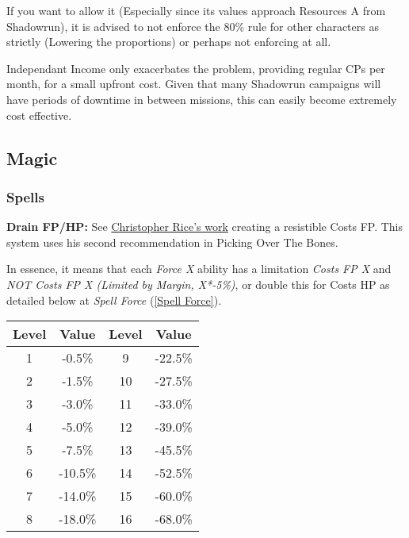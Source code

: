 \begin{multicols*}{2}
	If you want to allow it (Especially since its values approach Resources A from Shadowrun), it is advised to not enforce the 80\% rule for other characters as strictly (Lowering the proportions) or perhaps not enforcing at all.
	
	Independant Income only exacerbates the problem, providing regular CPs per month, for a small upfront cost. Given that many Shadowrun campaigns will have periods of downtime in between missions, this can easily become extremely cost effective.
	
	\subsection{Magic}
	
	\subsubsection{Spells}
	
	\textbf{Drain FP/HP:}
	See \textcolor{Blue}{\href{https://www.ravensnpennies.com/gurps101-fp-cost-limited-by-margin/}{Christopher Rice's work}} creating a resistible Costs FP. This system uses his second recommendation in Picking Over The Bones.
	
	In essence, it means that each \textit{Force X} ability has a limitation \textit{Costs FP X} and \textit{NOT Costs FP X (Limited by Margin, X*-5\%)}, or double this for Costs HP as detailed below at \textit{Spell Force} (\ref{Spell Force}).
	
	\begin{center}\label{drain_mods}
		\begin{tabular}{|c|c|c|c|}
			\hline
			Level & Value & Level & Value \\
			\hline
			\hline
			1 & -0.5\% & 9 & -22.5\% \\
			2 & -1.5\% & 10 & -27.5\% \\
			3 & -3.0\% & 11 & -33.0\% \\
			4 & -5.0\% & 12 & -39.0\% \\
			5 & -7.5\% & 13 & -45.5\% \\
			6 & -10.5\% & 14 & -52.5\% \\
			7 & -14.0\% & 15 & -60.0\% \\
			8 & -18.0\% & 16 & -68.0\% \\
			\hline
		\end{tabular}
	\end{center}
	

\end{multicols*}
